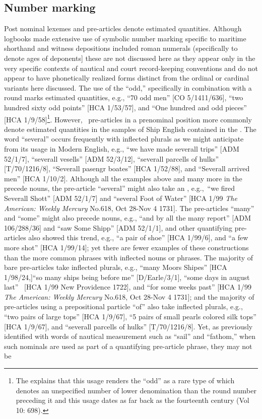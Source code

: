 \subsection{{Number marking}}\label{sec:5.3.2}

Post nominal lexemes and  pre-articles denote estimated quantities. Although logbooks made extensive use of symbolic number marking specific to maritime shorthand and witness depositions included roman numerals (specifically to denote ages of deponents] these are not discussed here as they appear only in the very specific contexts of nautical and court record-keeping conventions and do not appear to have phonetically realized forms distinct from the ordinal or cardinal variants here discussed.  The use of the  “odd,” specifically in combination with a round  marks estimated quantities, e.g., “70 odd men” [CO 5/1411/636], “two hundred sixty odd points” [HCA 1/53/57], and “One hundred and odd pieces” [HCA 1/9/58]\footnote{The \citet{oed1989} explains that this usage renders the  “odd” as a rare type of   which denotes an unspecified number of lower denomination than the round number preceding it and this usage dates as far back as the fourteenth century (Vol 10: 698).}.  However,~ pre-articles in a prenominal position more commonly denote estimated quantities in the samples of Ship English contained in the . The word “several” occurs frequently with inflected plurals as we might anticipate from its usage in Modern English, e.g., “we have made severall trips” [ADM 52/1/7], “severall vesells” [ADM 52/3/12], “severall parcells of hulks” [T/70/1216/8], “Severall pasengr boates” [HCA 1/52/88], and “Severall arrived men” [HCA 1/10/2]. Although all the examples above and many more in the  precede  nouns, the pre-article “several” might also take an  , e.g.,~“we fired Severall Shott” [ADM 52/1/7] and “several Foot of Water” [HCA 1/99 \textit{The American: Weekly Mercury} No.618, Oct 28-Nov 4 1731]. The pre-articles “many” and “some” might also precede  nouns, e.g., “and by all the many report” [ADM 106/288/36] and “saw Some Shipp” [ADM 52/1/1], and other quantifying pre-articles also showed this trend, e.g., “a pair of shoe” [HCA 1/99/6], and “a few more shot” [HCA 1/99/14]; yet there are fewer examples of these constructions than the more common phrases with inflected nouns or  phrases. The majority of bare pre-articles take inflected plurals, e.g., “many Moors Shipes” [HCA 1/98/24,]“so many ships being before me” [D/Earle/3/1], “some days in august last” ~[HCA 1/99 New Providence 1722], and “for some weeks past” [HCA 1/99 \textit{The American: Weekly Mercury} No.618, Oct 28-Nov 4 1731]; and the majority of pre-articles using a prepositional particle “of” also take inflected plurals, e.g., “two pairs of large tops” [HCA 1/9/67], “5 pairs of small pearls colored silk tops” [HCA 1/9/67], and “severall parcells of hulks” [T/70/1216/8]. Yet, as previously identified with words of nautical measurement such as “sail” and “fathom,” when such nominals are used as part of a quantifying pre-article phrase, they may not be 